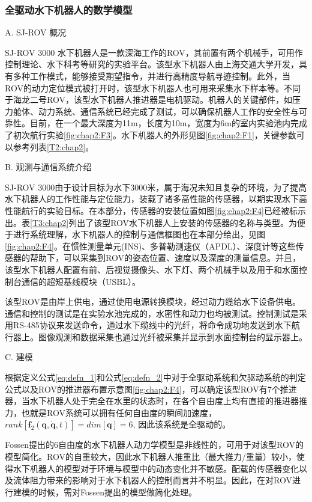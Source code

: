 \subsubsection{全驱动水下机器人的数学模型 }

A. SJ-ROV 概况

SJ-ROV 3000 水下机器人是一款深海工作的ROV，其前置有两个机械手，可用作控制理论、水下科考等研究的实验平台。该型水下机器人由上海交通大学开发，具有多种工作模式，能够接受期望指令，并进行高精度导航寻迹控制\cite{lekkas2013line}。此外，当ROV的动力定位模式被打开时，该型水下机器人也可用来采集水下样本等。不同于海龙二号ROV\cite{xu2005deeprov,Huo2016Impulse}，该型水下机器人推进器是电机驱动。机器人的关键部件，如压力舱体、动力系统、通信系统已经完成了测试，可以确保机器人工作的安全性与可靠性。目前，在一个最大深度为11m，长度为10m，宽度为6m的室内实验池内完成了初次航行实验\ref{fig:chap2:F3}。水下机器人的外形见图\ref{fig:chap2:F1}，关键参数可以参考列表\ref{T2:chap2}。


B. 观测与通信系统介绍

SJ-ROV 3000由于设计目标为水下3000米，属于海况未知且复杂的环境，为了提高水下机器人的工作性能与定位能力，装载了诸多高性能的传感器，以期实现水下高性能航行的实验目标。在本部分，传感器的安装位置如图\ref{fig:chap2:F4}已经被标示出。表\ref{T3:chap2}列出了该型ROV水下机器人上安装的传感器的名称与类型。为便于进行系统理解，水下机器人的控制与通信框图也在本部分给出，见图\ref{fig:chap2:F4}。在惯性测量单元(INS)、多普勒测速仪（APDL）、深度计等这些传感器的帮助下，可以采集到ROV的姿态位置、速度以及深度的测量信息。并且，该型水下机器人配置有前、后视觉摄像头、水下灯、两个机械手以及用于和水面控制台通信的超短基线模块（USBL）。


该型ROV是由岸上供电，通过使用电源转换模块，经过动力缆给水下设备供电。通信和控制的测试是在实验水池完成的，水密性和动力也均被测试。控制测试是采用RS-485协议来发送命令，通过水下缆线中的光纤，将命令成功地发送到水下航行器上。图像观测和数据采集也通过光纤被采集并显示到水面控制台的显示器上。

C. 建模

根据定义公式\ref{eq:defn_1}和公式\ref{eq:defn_2}中对于全驱动系统和欠驱动系统的判定公式以及ROV的推进器布置示意图\ref{fig:chap2:F4}，可以确定该型ROV有7个推进器，当水下机器人处于完全在水里的状态时，在各个自由度上均有直接的推进器推力，也就是ROV系统可以拥有任何自由度的瞬间加速度，${rank}[\bm{f}_2(\bm{q},{\dot{\bm{q}}},t)]=dim[\bm{q}] =6$, 因此该系统是全驱动的。

Fossen提出的6自由度的水下机器人动力学模型是非线性的，可用于对该型ROV的模型简化。ROV的自重较大，因此水下机器人推重比（最大推力/重量）较小，使得水下机器人的模型对于环境与模型中的动态变化并不敏感。配载的传感器变化以及流体阻力带来的影响对于水下机器人的控制而言并不明显。因此，在对ROV进行建模的时候，需对Fossen提出的模型做简化处理。

